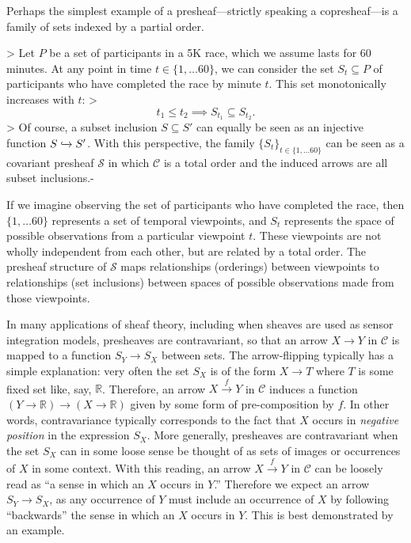 Perhaps the simplest example of a presheaf---strictly speaking a copresheaf---is a family of sets indexed by a partial order.
\begin{example}\label{exm:race}
>   Let $P$ be a set of participants in a 5K race, which we assume lasts for 60 minutes. At any point in time $t \in \{1, \ldots 60\}$, we can consider the set $S_t \subseteq P$ of participants who have completed the race by minute $t$. This set monotonically increases with $t$:
>   \[t_1 \leq t_2 \implies S_{t_1} \subseteq S_{t_2}.\]
>   Of course, a subset inclusion $S \subseteq S'$ can equally be seen as an injective function $S \xhookrightarrow{} S'$. With this perspective, the family $\{S_t\}_{t \in \{1, \ldots 60\}}$ can be seen as a covariant presheaf $\mathcal{S}$ in which $\mathcal{C}$ is a total order and the induced arrows are all subset inclusions.-
\end{example}
If we imagine observing the set of participants who have completed the race, then $\{1, \ldots 60\}$ represents a set of temporal viewpoints, and $S_{t}$ represents the space of possible observations from a particular viewpoint $t$. These viewpoints are not wholly independent from each other, but are related by a total order. The presheaf structure of $\mathcal{S}$ maps relationships (orderings) between viewpoints to relationships (set inclusions) between spaces of possible observations made from those viewpoints.

In many applications of sheaf theory, including when sheaves are used as sensor integration models, presheaves are contravariant, so that an arrow $X \to Y$ in $\mathcal{C}$ is mapped to a function $S_Y \to S_X$ between sets. The arrow-flipping typically has a simple explanation: very often the set $S_X$ is of the form $X \to T$ where $T$ is some fixed set like, say, $\mathbb{R}$. Therefore, an arrow $X \xrightarrow{f} Y$ in $\mathcal{C}$ induces a function $\left(Y \to \mathbb{R}\right) \to \left(X \to \mathbb{R}\right)$ given by some form of pre-composition by $f$. In other words, contravariance typically corresponds to the fact that $X$ occurs in \emph{negative position} in the expression $S_X$. More generally, presheaves are contravariant when the set $S_X$ can in some loose sense be thought of as sets of images or occurrences of $X$ in some context. With this reading, an arrow $X \xrightarrow{f} Y$ in $\mathcal{C}$ can be loosely read as ``a sense in which an $X$ occurs in $Y$.'' Therefore we expect an arrow $S_Y \to S_X$, as any occurrence of $Y$ must include an occurrence of $X$ by following ``backwards'' the sense in which an $X$ occurs in $Y$. This is best demonstrated by an example.

